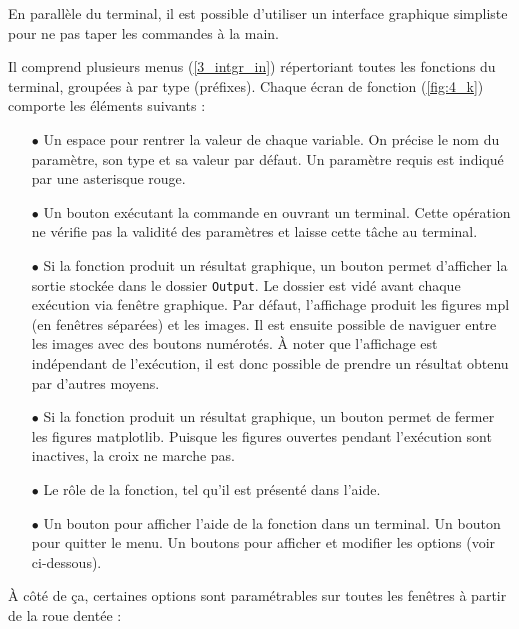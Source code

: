 \documentclass[12pt]{article}
\begin{document}
    En parallèle du terminal, il est possible d'utiliser un interface graphique simpliste pour ne pas taper les commandes à la main.

    \label{3_intgr_out} Il comprend plusieurs menus (\ref{3_intgr_in}) répertoriant toutes les fonctions du terminal, groupées à par type (préfixes). Chaque écran de fonction (\ref{fig:4_k}) comporte les éléments suivants :

    \begin{enumerate}
        \item[$\bullet$] Un espace pour rentrer la valeur de chaque variable. On précise le nom du paramètre, son type et sa valeur par défaut. Un paramètre requis est indiqué par une asterisque rouge.

        \item[$\bullet$] Un bouton exécutant la commande en ouvrant un terminal. Cette opération ne vérifie pas la validité des paramètres et laisse cette tâche au terminal.

        \item[$\bullet$] Si la fonction produit un résultat graphique, un bouton permet d'afficher la sortie stockée dans le dossier \texttt{Output}. Le dossier est vidé avant chaque exécution via fenêtre graphique. Par défaut, l'affichage produit les figures mpl (en fenêtres séparées) et les images. Il est ensuite possible de naviguer entre les images avec des boutons numérotés. À noter que l'affichage est indépendant de l'exécution, il est donc possible de prendre un résultat obtenu par d'autres moyens.

        \item[$\bullet$] Si la fonction produit un résultat graphique, un bouton permet de fermer les figures matplotlib. Puisque les figures ouvertes pendant l'exécution sont inactives, la croix ne marche pas.

        \item[$\bullet$] Le rôle de la fonction, tel qu'il est présenté dans l'aide.

        \item[$\bullet$] Un bouton pour afficher l'aide de la fonction dans un terminal. Un bouton pour quitter le menu. Un boutons pour afficher et modifier les options (voir ci-dessous).
    \end{enumerate}

    À côté de ça, certaines options sont paramétrables sur toutes les fenêtres à partir de la roue dentée :
\end{document}

